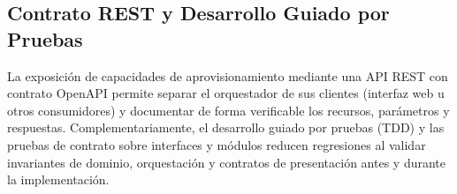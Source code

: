 \subsection{Contrato REST y Desarrollo Guiado por Pruebas}
La exposición de capacidades de aprovisionamiento mediante una API REST con contrato OpenAPI permite separar el orquestador de sus clientes (interfaz web u otros consumidores) y documentar de forma verificable los recursos, parámetros y respuestas. Complementariamente, el desarrollo guiado por pruebas (TDD) y las pruebas de contrato sobre interfaces y módulos reducen regresiones al validar invariantes de dominio, orquestación y contratos de presentación antes y durante la implementación.

